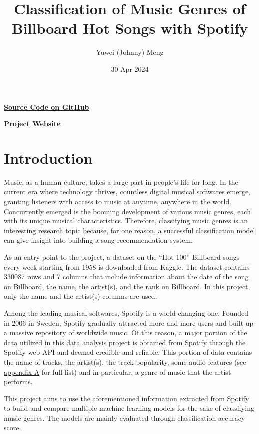 \documentclass{article}
\title{Classification of Music Genres of Billboard Hot Songs with Spotify}
\author{Yuwei (Johnny) Meng}
\date{30 Apr 2024}
\begin{document}
\pagestyle{fancy}

\maketitle

\href{https://github.com/BullDF/billboard-songs-analysis-with-spotify/tree/main}{\textbf{Source Code on GitHub}}

\href{https://bulldf.github.io/billboard-songs-analysis-with-spotify/}{\textbf{Project Website}}

\section{Introduction}

Music, as a human culture, takes a large part in people's life for long. In the current era where technology thrives, countless digital musical softwares emerge, granting listeners with access to music at anytime, anywhere in the world. Concurrently emerged is the booming development of various music genres, each with its unique musical characteristics. Therefore, classifying music genres is an interesting research topic because, for one reason, a successful classification model can give insight into building a song recommendation system.

As an entry point to the project, a dataset on the ``Hot 100'' Billboard songs every week starting from 1958 is downloaded from Kaggle. The dataset contains 330087 rows and 7 columns that include information about the date of the song on Billboard, the name, the artist(s), and the rank on Billboard. In this project, only the name and the artist(s) columns are used.

Among the leading musical softwares, Spotify is a world-changing one. Founded in 2006 in Sweden, Spotify gradually attracted more and more users and built up a massive repository of worldwide music. Of this reason, a major portion of the data utilized in this data analysis project is obtained from Spotify through the Spotify web API and deemed credible and reliable. This portion of data contains the name of tracks, the artist(s), the track popularity, some audio features (see \hyperref[sec:audio_features]{appendix A} for full list) and in particular, a genre of music that the artist performs.

This project aims to use the aforementioned information extracted from Spotify to build and compare multiple machine learning models for the sake of classifying music genres. The models are mainly evaluated through classification accuracy score.
\end{document}
